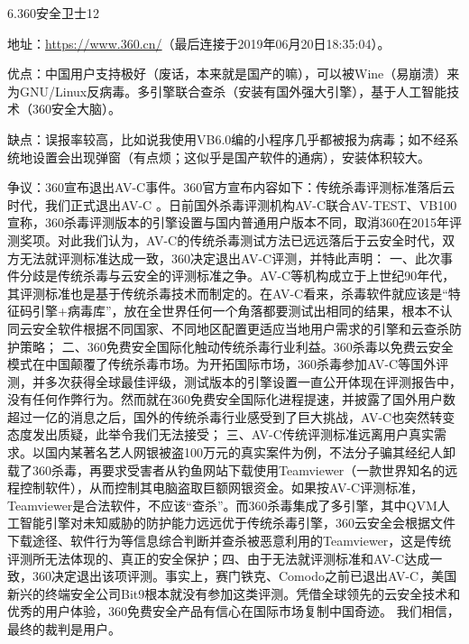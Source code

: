 6.360安全卫士12\par
地址：\url{https://www.360.cn/}（最后连接于2019年06月20日18:35:04）。\par
优点：中国用户支持极好（废话，本来就是国产的嘛），可以被Wine（易崩溃）来为GNU/Linux反病毒。多引擎联合查杀（安装有国外强大引擎），基于人工智能技术（360安全大脑）。\par
缺点：误报率较高，比如说我使用VB6.0编的小程序几乎都被报为病毒；如不经系统地设置会出现弹窗（有点烦；这似乎是国产软件的通病），安装体积较大。\par
争议：360宣布退出AV-C事件。360官方宣布内容如下：传统杀毒评测标准落后云时代，我们正式退出AV-C 。日前国外杀毒评测机构AV-C联合AV-TEST、VB100宣称，360杀毒评测版本的引擎设置与国内普通用户版本不同，取消360在2015年评测奖项。对此我们认为，AV-C的传统杀毒测试方法已远远落后于云安全时代，双方无法就评测标准达成一致，360决定退出AV-C评测，并特此声明： 一、此次事件分歧是传统杀毒与云安全的评测标准之争。AV-C等机构成立于上世纪90年代，其评测标准也是基于传统杀毒技术而制定的。在AV-C看来，杀毒软件就应该是“特征码引擎+病毒库”，放在全世界任何一个角落都要测试出相同的结果，根本不认同云安全软件根据不同国家、不同地区配置更适应当地用户需求的引擎和云查杀防护策略； 二、360免费安全国际化触动传统杀毒行业利益。360杀毒以免费云安全模式在中国颠覆了传统杀毒市场。为开拓国际市场，360杀毒参加AV-C等国外评测，并多次获得全球最佳评级，测试版本的引擎设置一直公开体现在评测报告中，没有任何作弊行为。然而就在360免费安全国际化进程提速，并披露了国外用户数超过一亿的消息之后，国外的传统杀毒行业感受到了巨大挑战，AV-C也突然转变态度发出质疑，此举令我们无法接受； 三、AV-C传统评测标准远离用户真实需求。以国内某著名艺人网银被盗100万元的真实案件为例，不法分子骗其经纪人卸载了360杀毒，再要求受害者从钓鱼网站下载使用Teamviewer（一款世界知名的远程控制软件），从而控制其电脑盗取巨额网银资金。如果按AV-C评测标准，Teamviewer是合法软件，不应该“查杀”。而360杀毒集成了多引擎，其中QVM人工智能引擎对未知威胁的防护能力远远优于传统杀毒引擎，360云安全会根据文件下载途径、软件行为等信息综合判断并查杀被恶意利用的Teamviewer，这是传统评测所无法体现的、真正的安全保护；四、由于无法就评测标准和AV-C达成一致，360决定退出该项评测。事实上，赛门铁克、Comodo之前已退出AV-C，美国新兴的终端安全公司Bit9根本就没有参加这类评测。凭借全球领先的云安全技术和优秀的用户体验，360免费安全产品有信心在国际市场复制中国奇迹。 我们相信，最终的裁判是用户。 \par
